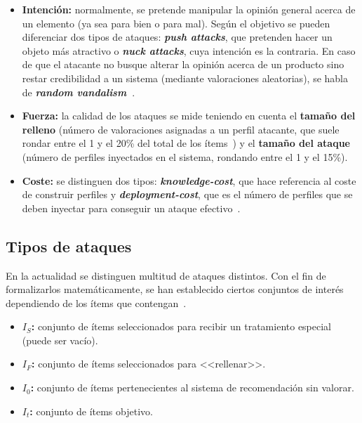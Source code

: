\begin{itemize}
	
	\item \textbf{Intención:} normalmente, se pretende manipular la opinión general acerca de un elemento (ya sea para bien o para mal). Según el objetivo se pueden diferenciar dos tipos de ataques: \textbf{\textit{push attacks}}, que pretenden hacer un objeto más atractivo o \textbf{\textit{nuck attacks}}, cuya intención es la contraria. En caso de que el atacante no busque alterar la opinión acerca de un producto sino restar credibilidad a un sistema (mediante valoraciones aleatorias), se habla de \textbf{\textit{random vandalism}~\cite{Burke2015RobustCollaborative}}.
	
	\item \textbf{Fuerza:} la calidad de los ataques se mide teniendo en cuenta el \textbf{tamaño del relleno} (número de valoraciones asignadas a un perfil atacante, que suele rondar entre el 1 y el 20\% del total de los ítems~\cite{mingdan2018ShillingAttacksAReview}) y el \textbf{tamaño del ataque} (número de perfiles inyectados en el sistema, rondando entre el 1 y el 15\%).
	
	\item \textbf{Coste:} se distinguen dos tipos: \textbf{\textit{knowledge-cost}}, que hace referencia al coste de construir perfiles y \textbf{\textit{deployment-cost}}, que es el número de perfiles que se deben inyectar para conseguir un ataque efectivo~\cite{Mobasher2006Thesis}.
	
\end{itemize}

		
\subsection{Tipos de ataques}

En la actualidad se distinguen multitud de ataques distintos. Con el fin de formalizarlos matemáticamente, se han establecido ciertos conjuntos de interés dependiendo de los ítems que contengan~\cite{zhou2021SemisupervisedRecommendationAttack}.

\begin{itemize}
	
	\item \textbf{$I_S$:} conjunto de ítems seleccionados para recibir un tratamiento especial (puede ser vacío).
	\item \textbf{$I_F$:} conjunto de ítems seleccionados para <<rellenar>>.
	\item \textbf{$I_0$:} conjunto de ítems pertenecientes al sistema de recomendación sin valorar.
	\item \textbf{$I_t$:} conjunto de ítems objetivo.
	
\end{itemize}


